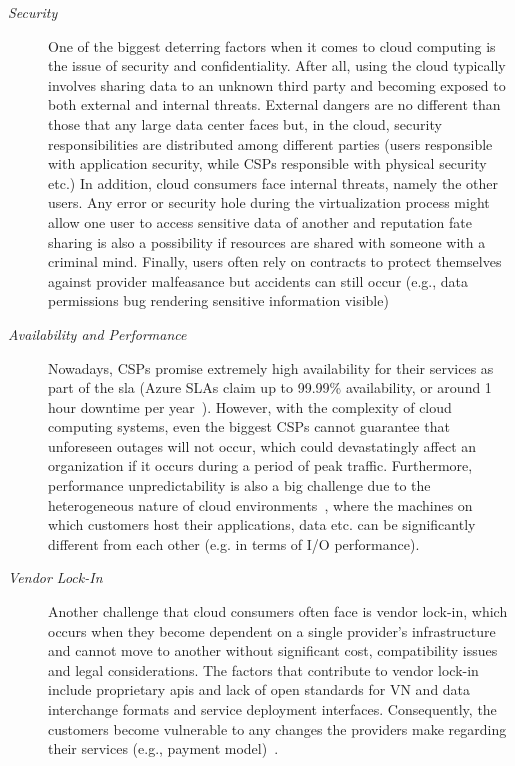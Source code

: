 \begin{description}
    \item [\textit{Security}] One of the biggest deterring factors when it comes to cloud computing is the issue of security and confidentiality. After all, using the cloud typically involves sharing data to an unknown third party and becoming exposed to both external and internal threats. External dangers are no different than those that any large data center faces but, in the cloud, security responsibilities are distributed among different parties (users responsible with application security, while CSPs responsible with physical security etc.) In addition, cloud consumers face internal threats, namely the other users. Any error or security hole during the virtualization process might allow one user to access sensitive data of another and reputation fate sharing is also a possibility if resources are shared with someone with a criminal mind. Finally, users often rely on contracts to protect themselves against provider malfeasance but accidents can still occur (e.g., data permissions bug rendering sensitive information visible)

    \item[\textit{Availability and Performance}] Nowadays, CSPs promise extremely high availability for their services as part of the \ac{sla} (Azure SLAs claim up to 99.99\% availability, or around 1 hour downtime per year~\cite{availability}). However, with the complexity of cloud computing systems,  even the biggest CSPs cannot guarantee that unforeseen outages will not occur, which could devastatingly affect an organization if it occurs during a period of peak traffic. Furthermore, performance unpredictability is also a big challenge due to the heterogeneous nature of cloud environments~\cite{performance}, where the machines on which customers host their applications, data etc. can be significantly different from each other (e.g. in terms of I/O performance).

    \item[\textit{Vendor Lock-In}]  Another challenge that cloud consumers often face is vendor lock-in,  which occurs when they become dependent on a single provider's infrastructure and cannot move to another without significant cost, compatibility issues and legal considerations. The factors that contribute to vendor lock-in include proprietary \ac{api}s and lack of open standards for VN and data interchange formats and service deployment interfaces. Consequently, the customers become vulnerable to any changes the providers make regarding their services (e.g., payment model)~\cite{lock-in}.


\end{description}
